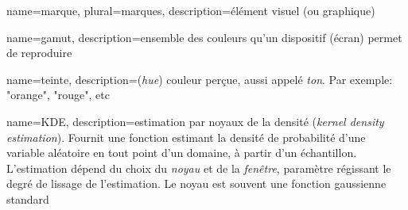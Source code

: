 {
	name=marque,
	plural={marques},
	description={élément visuel (ou graphique)}
}

{
        name=gamut,
        description={ensemble des couleurs qu'un dispositif (écran) permet de reproduire}
}

{
	name=teinte,
	description={(\emph{hue}) couleur perçue, aussi appelé \emph{ton}. Par exemple: "orange", "rouge", etc}
}



{
        name=KDE,
        description={estimation par noyaux de la densité (\emph{kernel density estimation}). Fournit une fonction estimant la densité de probabilité d'une variable aléatoire en tout point d'un domaine, à partir d'un échantillon. L'estimation dépend du choix du \emph{noyau} et de la \emph{fenêtre}, paramètre régissant le degré de lissage de l'estimation. Le noyau est souvent une fonction gaussienne standard  }
}


